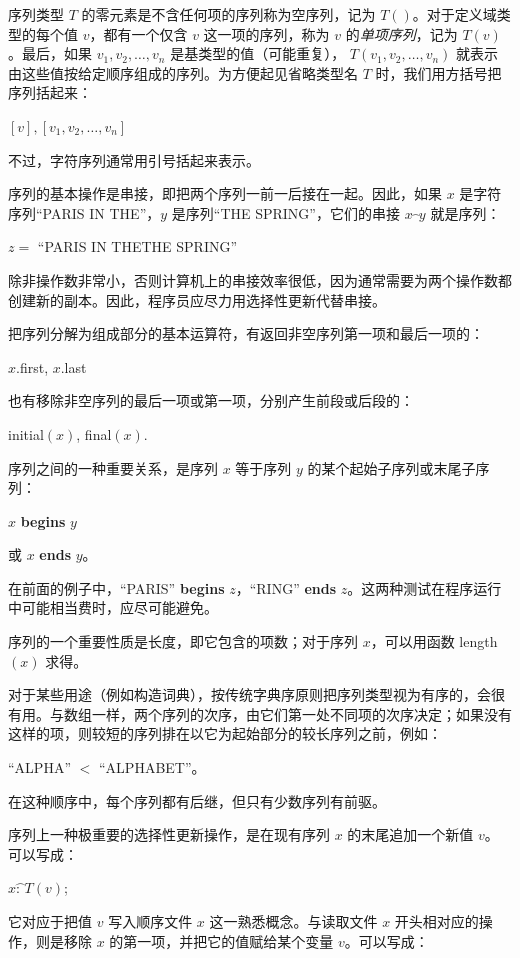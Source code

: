 \documentclass[twoside,11pt,fontset=none]{ctexbook}
\let\wideparen\overparen
\begin{document}
序列类型 $T$ 的零元素是不含任何项的序列\textemdash{}称为空序列，记为 $T()$。对于定义域类型的每个值 $v$，都有一个仅含 $v$ 这一项的序列，称为 $v$ 的\textit{单项序列}，记为 $T(v)$。最后，如果 $v_1, v_2, \dots, v_n$ 是基类型的值（可能重复），
$T(v_1, v_2, \dots, v_n)$ 就表示由这些值按给定顺序组成的序列。为方便起见省略类型名 $T$ 时，我们用方括号把序列括起来：

\quad $[v],$\qquad $[v_1, v_2, \dots, v_n]$

\noindent
不过，字符序列通常用引号括起来表示。

序列的基本操作是串接，即把两个序列一前一后接在一起。因此，如果 $x$ 是字符序列“PARIS IN THE”，$y$ 是序列“THE SPRING”，它们的串接 $x\wideparen{\ \ }y$ 就是序列：

\quad $z =$ ``PARIS IN THETHE SPRING''

\noindent
除非操作数非常小，否则计算机上的串接效率很低，因为通常需要为两个操作数都创建新的副本。因此，程序员应尽力用选择性更新代替串接。

把序列分解为组成部分的基本运算符，有返回非空序列第一项和最后一项的：

\quad $x$.first, $x$.last

\noindent
也有移除非空序列的最后一项或第一项，分别产生前段或后段的：

\quad initial$(x)$, final$(x)$.

序列之间的一种重要关系，是序列 $x$ 等于序列 $y$ 的某个起始子序列或末尾子序列：

\quad $x$ \textbf{begins} $y$

\quad 或 $x$ \textbf{ends} $y$。

\noindent
在前面的例子中，“PARIS” \textbf{begins} $z$，“RING” \textbf{ends} $z$。这两种测试在程序运行中可能相当费时，应尽可能避免。

序列的一个重要性质是长度，即它包含的项数；对于序列 $x$，可以用函数 length$(x)$ 求得。

对于某些用途（例如构造词典），按传统字典序原则把序列类型视为有序的，会很有用。与数组一样，两个序列的次序，由它们第一处不同项的次序决定；如果没有这样的项，则较短的序列排在以它为起始部分的较长序列之前，例如：

\quad ``ALPHA'' $<$ ``ALPHABET''。

\noindent
在这种顺序中，每个序列都有后继，但只有少数序列有前驱。

序列上一种极重要的选择性更新操作，是在现有序列 $x$ 的末尾追加一个新值 $v$。可以写成：


\quad $x\wideparen{\text{: \ } }T(v)$;

\noindent
它对应于把值 $v$ 写入顺序文件 $x$ 这一熟悉概念。与读取文件 $x$ 开头相对应的操作，则是移除 $x$ 的第一项，并把它的值赋给某个变量 $v$。可以写成：
\end{document}
